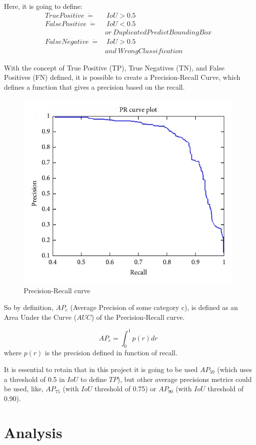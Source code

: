 \documentclass[11pt, a4paper, onecolumn]{article}
\begin{document}
Here, it is going to define:
\begin{align*}
TruePositive\ \dot=&\ IoU > 0.5 \\
FalsePositive\ \dot=&\ IoU < 0.5 \\
&or\ Duplicated PredictBoundingBox \\
FalseNegative\ \dot=&\ IoU > 0.5\ \\ 
&and \ WrongClassification
\end{align*}

With the concept of True Positive (TP), True Negatives (TN), and False Positives (FN) defined, it is possible to create a Precision-Recall Curve, which defines a function that gives a precision based on the recall.

\begin{figure}[!ht]
	
	\centering
	\includegraphics[width=.5\textwidth]{precision-recall.png}
	\caption{\scriptsize Precision-Recall curve \cite{medium:1}}
	
\end{figure}

So by definition, $AP_c$ (Average Precision of some category c), is defined as an Area Under the Curve ($AUC$) of the Precision-Recall curve.

{\centering
	\begin{equation*}
	AP_c = \int_{0}^{1} p(r) dr
	\end{equation*}
	where $p(r)$ is the precision defined in function of recall.}

It is essential to retain that in this project it is going to be used $AP_{50}$ (which uses a threshold of 0.5 in $IoU$ to define $TP$), but other average precisions metrics could be used, like, $AP_{75}$ (with $IoU$ threshold of 0.75) or $AP_{90}$ (with $IoU$ threshold of 0.90).

\section{Analysis}
\end{document}
